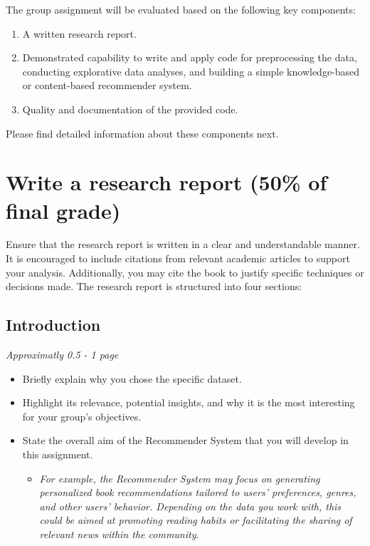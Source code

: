 The group assignment will be evaluated based on the following key components:

\begin{enumerate}
\item A written research report.
\item Demonstrated capability to write and apply code for preprocessing the data, conducting explorative data analyses, and building a simple knowledge-based or content-based recommender system.
\item Quality and documentation of the provided code.
\end{enumerate}

Please find detailed information about these components next. 

\section{Write a research report (50\% of final grade)}

Ensure that the research report is written in a clear and understandable manner. It is encouraged to include citations from relevant academic articles to support your analysis. Additionally, you may cite the book \citep{van_atteveldt_computational_2022} to justify specific techniques or decisions made. The research report is structured into four sections:

\subsection{Introduction}
\textit{Approximatly 0.5 - 1 page}
\begin{itemize}
	\item Briefly explain why you chose the specific dataset. 
	\item Highlight its relevance, potential insights, and why it is the most interesting for your group's objectives.
	\item State the overall aim of the Recommender System that you will develop in this assignment.
	\begin{itemize}
		\item \emph{For example, the Recommender System may focus on generating personalized book recommendations tailored to users' preferences, genres, and other users' behavior. Depending on the data you work with, this could be aimed at promoting reading habits or facilitating the sharing of relevant news within the community}.
	\end{itemize}
\end{itemize}


